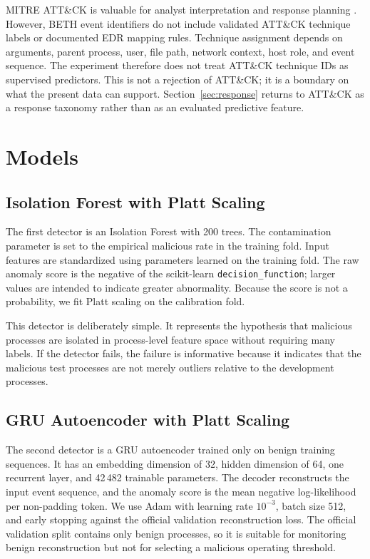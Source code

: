 \documentclass[journal]{IEEEtran}
\begin{document}
MITRE ATT\&CK is valuable for analyst interpretation and response planning \cite{mitre2023,strom2018}. However, BETH event identifiers do not include validated ATT\&CK technique labels or documented EDR mapping rules. Technique assignment depends on arguments, parent process, user, file path, network context, host role, and event sequence. The experiment therefore does not treat ATT\&CK technique IDs as supervised predictors. This is not a rejection of ATT\&CK; it is a boundary on what the present data can support. Section~\ref{sec:response} returns to ATT\&CK as a response taxonomy rather than as an evaluated predictive feature.

\section{Models}
\label{sec:models}

\subsection{Isolation Forest with Platt Scaling}

The first detector is an Isolation Forest \cite{liu2008} with 200 trees. The contamination parameter is set to the empirical malicious rate in the training fold. Input features are standardized using parameters learned on the training fold. The raw anomaly score is the negative of the scikit-learn \texttt{decision\_function}; larger values are intended to indicate greater abnormality. Because the score is not a probability, we fit Platt scaling on the calibration fold.

This detector is deliberately simple. It represents the hypothesis that malicious processes are isolated in process-level feature space without requiring many labels. If the detector fails, the failure is informative because it indicates that the malicious test processes are not merely outliers relative to the development processes.

\subsection{GRU Autoencoder with Platt Scaling}

The second detector is a GRU autoencoder trained only on benign training sequences. It has an embedding dimension of 32, hidden dimension of 64, one recurrent layer, and 42\,482 trainable parameters. The decoder reconstructs the input event sequence, and the anomaly score is the mean negative log-likelihood per non-padding token. We use Adam with learning rate $10^{-3}$, batch size 512, and early stopping against the official validation reconstruction loss. The official validation split contains only benign processes, so it is suitable for monitoring benign reconstruction but not for selecting a malicious operating threshold.
\end{document}
